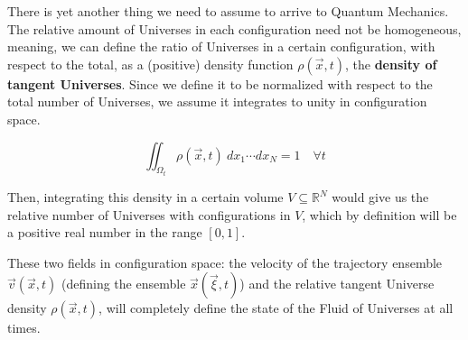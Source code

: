 \documentclass[11pt, a4paper]{article} %
\newcommand{\R}{\mathbb{R}} %
\DeclareRobustCommand{\mybox}[2][gray!10]{%
\begin{tcolorbox}[   %
        left=0.2cm,
        right=0.2cm,
        top=0.15cm,
        bottom=0.15cm,
        colback=#1,
        colframe=#1,
        width=\dimexpr\textwidth\relax, 
        enlarge left by=0mm,
        boxsep=5pt,
        arc=0pt,outer arc=0pt,
        ]
        #2
\end{tcolorbox}
}
\begin{document}
There is yet another thing we need to assume to arrive to Quantum Mechanics. The relative amount of Universes in each configuration need not be homogeneous, meaning, we can define the ratio of Universes in a certain configuration, with respect to the total, as a (positive) density function $\rho(\vec{x},t)$, the {\bf density of tangent Universes}. Since we define it to be normalized with respect to the total number of Universes, we assume it integrates to unity in configuration space.

\begin{equation}
\iint_{\Omega_t} \rho(\vec{x},t)\ dx_1\cdots dx_N=1\quad \forall t
\end{equation}

Then, integrating this density in a certain volume $V\subseteq\R^N$ would give us the relative number of Universes with configurations in $V$, which by definition will be a positive real number in the range $[0,1]$.

These two fields in configuration space: the velocity of the trajectory ensemble $\vec{v}(\vec{x},t)$ (defining the ensemble $\vec{x}(\vec{\xi},t)$) and the relative tangent Universe density $\rho(\vec{x},t)$, will completely define the state of the Fluid of Universes at all times.


\end{document}
